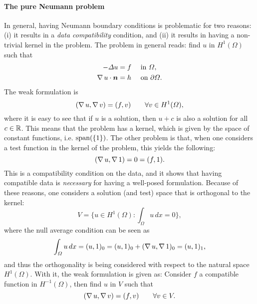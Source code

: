 \paragraph{The pure Neumann problem} In general, having Neumann boundary conditions is problematic for two reasons: (i) it results in a \emph{data compatibility} condition, and (ii) it results in having a non-trivial kernel in the problem. The problem in general reads: find $u$ in $H^1(\Omega)$ such that
\begin{equation}
    \begin{aligned}
        -\Delta u &= f && \tin\Omega ,\\
        \grad u \cdot \vec n &= h && \ton\partial\Omega.
    \end{aligned}
\end{equation}
The weak formulation is 
\begin{equation}
    (\operatorname{\nabla} u, \operatorname{\nabla} v) = (f, v) \qquad \forall v\in H^1(\Omega),
\end{equation}
where it is easy to see that if $u$ is a solution, then $u+c$ is also a solution for all $c\in \mathbb{R}$. This means that the problem has a kernel, which is given by the space of constant functions, i.e. $\operatorname{\text{span}}(\{1\})$. The other problem is that, when one considers a test function in the kernel of the problem, this yields the following: 
\begin{equation}
    (\operatorname{\nabla} u, \operatorname{\nabla} 1) = 0 = (f, 1) .
\end{equation}
This is a compatibility condition on the data, and it shows that having compatible data is \emph{necessary} for having a well-posed formulation. Because of these reasons, one considers a solution (and test) space that is orthogonal to the kernel: 
\begin{equation}
    V = \{u\in H^1(\Omega): \int_\Omega u \,dx = 0\},
\end{equation}
where the null average condition can be seen as 
\begin{equation}
    \int_\Omega u \,dx = (u, 1)_0 = (u,1)_0 + (\operatorname{\nabla} u, \operatorname{\nabla} 1)_0 = (u, 1)_1,
\end{equation}
and thus the orthogonality is being considered with respect to the natural space $H^1(\Omega)$. With it, the weak formulation is given as: Consider $f$ a compatible function in $H^{-1}(\Omega)$, then find $u$ in $V$ such that
\begin{equation}
    (\operatorname{\nabla} u, \operatorname{\nabla} v) = (f, v) \qquad \forall v\in V.
\end{equation}

